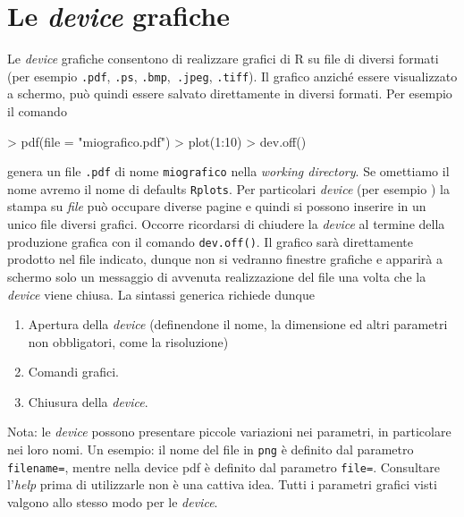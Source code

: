\documentclass[onecolumn,11pt]{book}
\begin{document}
\section{Le \emph{device} grafiche}
Le \emph{device} grafiche consentono di realizzare grafici di \textsf{R} su file di diversi formati (per esempio \texttt{.pdf}, \texttt{.ps}, \texttt{.bmp},\texttt{ .jpeg}, \texttt{.tiff}).
Il grafico anzich\'e essere  visualizzato a schermo, pu\`o quindi essere salvato direttamente in diversi formati. Per esempio il comando
\begin{Schunk}
\begin{Sinput}
> pdf(file = "miografico.pdf")
> plot(1:10)
> dev.off()
\end{Sinput}
\end{Schunk}
genera un file \texttt{.pdf} di nome \texttt{miografico} nella \emph{working directory}.
Se omettiamo il nome avremo il nome di defaults \texttt{Rplots}.
Per particolari \emph{device}  (per esempio ) la stampa su \emph{file} pu\`o occupare diverse pagine e quindi si possono inserire in un unico file diversi grafici.
Occorre ricordarsi di chiudere la \emph{device} al termine della produzione grafica con il comando \texttt{dev.off()}.
Il grafico sar\`a direttamente prodotto nel file indicato, dunque non si vedranno finestre grafiche e  apparir\`a  a schermo solo  un messaggio di avvenuta realizzazione del file una volta che la
\emph{device} viene chiusa. 
La sintassi generica richiede dunque
\begin{enumerate}
\item{}Apertura della \emph{device} (definendone il nome, la dimensione
ed altri parametri non obbligatori, come la risoluzione)
\item{} Comandi grafici.
\item{} Chiusura della \emph{device}.
\end{enumerate}
Nota: le \emph{device} possono presentare piccole variazioni nei parametri, in particolare nei loro nomi. Un esempio: il nome del file in \texttt{png} \`e  definito dal parametro \texttt{filename=}, mentre nella
device pdf \`e definito dal parametro \texttt{file=}. Consultare l'\emph{help} prima di utilizzarle non \`e  una cattiva idea. Tutti i parametri grafici visti valgono allo stesso modo per le \emph{device}.
\end{document}
